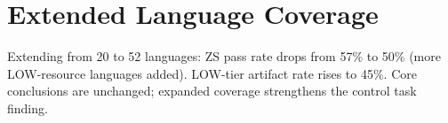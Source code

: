 \documentclass[11pt,a4paper]{article}
\begin{document}
\section{Extended Language Coverage}
\label{app:extended}

Extending from 20 to 52 languages: ZS pass rate drops from 57\% to 50\% (more LOW-resource languages added).
LOW-tier artifact rate rises to 45\%.
Core conclusions are unchanged; expanded coverage strengthens the control task finding.

%
%
\end{document}
